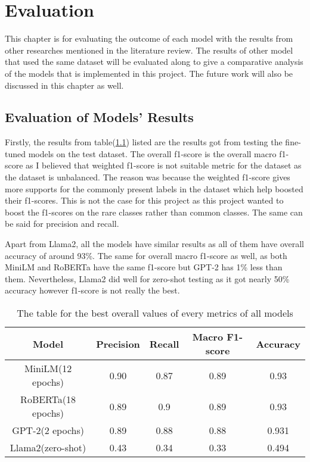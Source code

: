 
\chapter{Evaluation}

This chapter is for evaluating the outcome of each model with the results from other researches mentioned in the literature review. The results of other model that used the same dataset will be evaluated along to give a comparative analysis of the models that is implemented in this project. The future work will also be discussed in this chapter as well.

\section{Evaluation of Models' Results}
Firstly, the results from table(\ref{tab:overall_metrics_for_all_models}) listed are the results got from testing the fine-tuned models on the test dataset. The overall f1-score is the overall macro f1-score as I believed that weighted f1-score is not suitable metric for the dataset as the dataset is unbalanced. The reason was because the weighted f1-score gives more supports for the commonly present labels in the dataset which help boosted their f1-scores. This is not the case for this project as this project wanted to boost the f1-scores on the rare classes rather than common classes. The same can be said for precision and recall.

Apart from Llama2, all the models have similar results as all of them have overall accuracy of around 93\%. The same for overall macro f1-score as well, as both MiniLM and RoBERTa have the same f1-score but GPT-2 has 1\% less than them. Nevertheless, Llama2 did well for zero-shot testing as it got nearly 50\% accuracy however f1-score is not really the best.

\begin{table}[h!]
    \centering
    \begin{tabular}{|c|c|c|c|c|}\hline
          Model  & Precision & Recall & Macro F1-score & Accuracy\\\hline
           MiniLM(12 epochs) & 0.90 & 0.87 & 0.89 & 0.93\\\hline
           RoBERTa(18 epochs) & 0.89 & 0.9 & 0.89 & 0.93\\\hline
           GPT-2(2 epochs) & 0.89 & 0.88 & 0.88 & 0.931\\\hline
           Llama2(zero-shot) & 0.43 & 0.34 & 0.33 & 0.494\\\hline
    \end{tabular}
    \caption{The table for the best overall values of every metrics of all models}
    \label{tab:overall_metrics_for_all_models}
\end{table}

